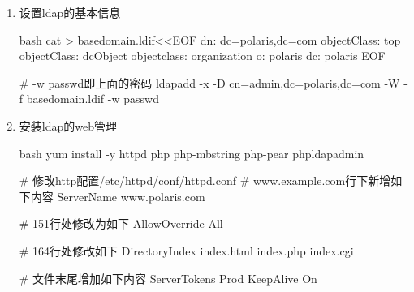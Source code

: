 \begin{enumerate}
  \begin{code-block}{bash}
  cat > chdomain.ldif<<EOF
  dn: olcDatabase={1}monitor,cn=config
  changetype: modify
  replace: olcAccess
  olcAccess: {0}to * by dn.base="gidNumber=0+uidNumber=0,cn=peercred,cn=external,cn=auth" read by dn.base="cn=admin,dc=polaris,dc=com" read by * none

  dn: olcDatabase={2}hdb,cn=config
  changetype: modify
  replace: olcSuffix
  olcSuffix: dc=polaris,dc=com

  dn: olcDatabase={2}hdb,cn=config
  changetype: modify
  replace: olcRootDN
  olcRootDN: cn=admin,dc=polaris,dc=com

  dn: olcDatabase={2}hdb,cn=config
  changetype: modify
  add: olcRootPW
  # 注意，密码同上
  olcRootPW: {SSHA}b/fmgl5zYUIag/NKjeYj/Sm3/ymCtLeb

  dn: olcDatabase={2}hdb,cn=config
  changetype: modify
  add: olcAccess
  olcAccess: {0}to attrs=userPassword,shadowLastChange by dn="cn=admin,dc=polaris,dc=com" write by anonymous auth by self write by * none
  olcAccess: {1}to dn.base="" by * read
  olcAccess: {2}to * by dn="cn=admin,dc=polaris,dc=com" write by * read
  EOF

  ldapmodify -Y EXTERNAL -H ldapi:/// -f chdomain.ldif
  \end{code-block}

  \item 设置ldap的基本信息

  \begin{code-block}{bash}
  cat > basedomain.ldif<<EOF
  dn: dc=polaris,dc=com
  objectClass: top
  objectClass: dcObject
  objectclass: organization
  o: polaris
  dc: polaris
  EOF

  # -w passwd即上面的密码
  ldapadd -x -D cn=admin,dc=polaris,dc=com -W -f basedomain.ldif -w passwd
  \end{code-block}

  \item 安装ldap的web管理
  \begin{code-block}{bash}
  yum install -y httpd php php-mbstring php-pear phpldapadmin

  # 修改http配置/etc/httpd/conf/httpd.conf
  # www.example.com行下新增如下内容
  ServerName www.polaris.com

  # 151行处修改为如下
  AllowOverride All

  # 164行处修改如下
  DirectoryIndex index.html index.php index.cgi

  # 文件末尾增加如下内容
  ServerTokens Prod
  KeepAlive On


\end{code-block}
\end{enumerate}
